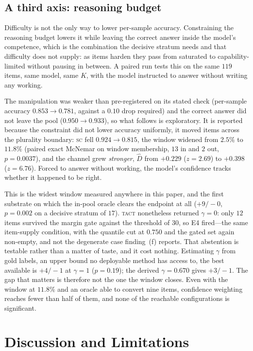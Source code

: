 \documentclass{article}
\newcommand{\Dhat}{\widehat{D}}
\newcommand{\SC}{\textsc{sc}}
\newcommand{\TACT}{\textsc{tact}}
\begin{document}
\subsection{A third axis: reasoning budget}\label{sec:budget}
Difficulty is not the only way to lower per-sample accuracy. Constraining the
reasoning budget lowers it while leaving the correct answer inside the model's
competence, which is the combination the decisive stratum needs and that
difficulty does not supply: as items harden they pass from saturated to
capability-limited without pausing in between. A paired run tests this on the
same $119$ items, same model, same $K$, with the model instructed to answer
without writing any working.

The manipulation was weaker than pre-registered on its stated check
(per-sample accuracy $0.853\to0.781$, against a $0.10$ drop required) and the
correct answer did not leave the pool ($0.950\to0.933$), so what follows is
exploratory. It is reported because the constraint did not lower accuracy
uniformly, it moved items across the plurality boundary: \SC{} fell $0.924\to
0.815$, the window widened from $2.5\%$ to $11.8\%$ (paired exact McNemar on
window membership, $13$ in and $2$ out, $p=0.0037$), and the channel grew
\emph{stronger}, $\Dhat$ from $+0.229$ ($z=2.69$) to $+0.398$ ($z=6.76$).
Forced to answer without working, the model's confidence tracks whether it
happened to be right.

This is the widest window measured anywhere in this paper, and the first
substrate on which the in-pool oracle clears the endpoint at all ($+9/-0$,
$p=0.002$ on a decisive stratum of $17$). \TACT{} nonetheless returned
$\gamma=0$: only $12$ items survived the margin gate against the threshold of
$30$, so E4 fired---the same item-supply condition, with the quantile cut at
$0.750$ and the gated set again non-empty, and not the degenerate case
finding~(f) reports. That abstention is testable rather than a matter of taste,
and it cost nothing. Estimating $\gamma$ from gold labels, an upper bound no
deployable method has access to, the best available is $+4/-1$ at $\gamma=1$
($p=0.19$); the derived $\gamma=0.670$ gives $+3/-1$. The gap that matters is
therefore not the one the window closes. Even with the window at $11.8\%$ and
an oracle able to convert nine items, confidence weighting reaches fewer than
half of them, and none of the reachable configurations is significant.

\section{Discussion and Limitations}\label{sec:limits}
\end{document}
